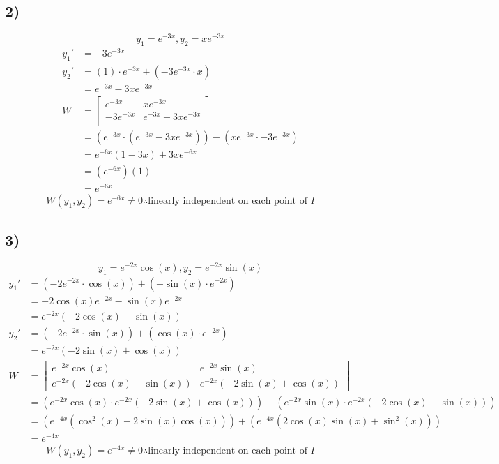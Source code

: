 \documentclass{article}
\begin{document}
\subsection{2)}
$$ y_1 = e^{-3x}, y_2 = xe^{-3x} $$
\begin{align*}
	y_1' & = -3e^{-3x} \\
	y_2' & = (1) \cdot e^{-3x} + (-3e^{-3x} \cdot x) \\
		 & = e^{-3x} - 3xe^{-3x} \\
	W & = \begin{bmatrix}
		e^{-3x} & xe^{-3x} \\
		-3e^{-3x} & e^{-3x} - 3xe^{-3x} \\
	\end{bmatrix} \\
	  & = \left( e^{-3x} \cdot \left( e^{-3x} - 3xe^{-3x} \right) \right) - \left( xe^{-3x} \cdot -3e^{-3x} \right) \\
	  & = e^{-6x}(1 - 3x) + 3xe^{-6x} \\
	  & = (e^{-6x})(1) \\
	  & = e^{-6x}
\end{align*}
\begin{equation*}
	\boxed{
		W(y_1,y_2) = e^{-6x} \neq 0 \therefore \text{linearly independent on each point of } I
	}
\end{equation*}

\subsection{3)}
$$ y_1 = e^{-2x}\cos(x), y_2 = e^{-2x}\sin(x) $$
\begin{align*}
	y_1' & = \left( -2e^{-2x} \cdot \cos(x) \right) + \left( -\sin(x) \cdot e^{-2x} \right) \\
		 & = -2\cos(x)e^{-2x} - \sin(x)e^{-2x} \\
		 & = e^{-2x} \left( -2\cos(x) - \sin(x) \right) \\
	y_2' & = \left( -2e^{-2x} \cdot \sin(x) \right) + \left( \cos(x) \cdot e^{-2x} \right) \\
		 & = e^{-2x} \left( -2\sin(x) + \cos(x) \right) \\
	W & = \begin{bmatrix}
		e^{-2x}\cos(x) & e^{-2x}\sin(x) \\
		e^{-2x} \left( -2\cos(x) - \sin(x) \right) & e^{-2x} \left( -2\sin(x) + \cos(x) \right)
	\end{bmatrix} \\
	  & = \left( e^{-2x}\cos(x) \cdot e^{-2x} \left( -2\sin(x) + \cos(x) \right) \right) - \left( e^{-2x}\sin(x) \cdot e^{-2x} \left( -2\cos(x) - \sin(x) \right) \right) \\
	  & = \left( e^{-4x} \left( \cos^2(x) - 2 \sin(x)\cos(x) \right) \right) + \left( e^{-4x} \left( 2\cos(x)\sin(x) + \sin^2(x) \right) \right) \\
	  & = e^{-4x}
\end{align*}
\begin{equation*}
	\boxed{
		W(y_1,y_2) = e^{-4x} \neq 0 \therefore \text{linearly independent on each point of } I
	}
\end{equation*}
\end{document}

